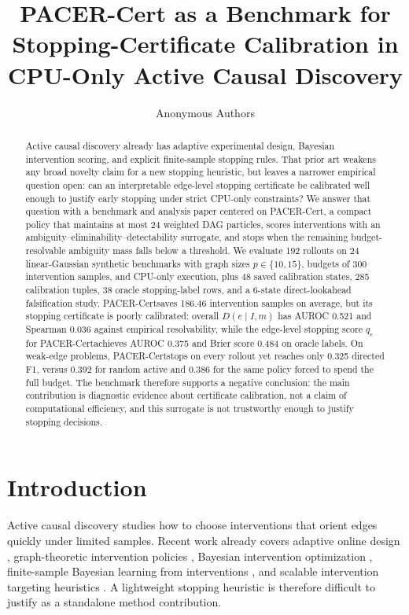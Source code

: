 \documentclass{article}
\title{PACER-Cert as a Benchmark for\\Stopping-Certificate Calibration in CPU-Only Active Causal Discovery}
\author{Anonymous Authors}
\newcommand{\method}{PACER-Cert}
\newcommand{\qe}{q_e}
\newcommand{\de}{D}
\begin{document}
\maketitle

\begin{abstract}
Active causal discovery already has adaptive experimental design, Bayesian intervention scoring, and explicit finite-sample stopping rules. That prior art weakens any broad novelty claim for a new stopping heuristic, but leaves a narrower empirical question open: can an interpretable edge-level stopping certificate be calibrated well enough to justify early stopping under strict CPU-only constraints? We answer that question with a benchmark and analysis paper centered on \method, a compact policy that maintains at most 24 weighted DAG particles, scores interventions with an ambiguity--eliminability--detectability surrogate, and stops when the remaining budget-resolvable ambiguity mass falls below a threshold. We evaluate 192 rollouts on 24 linear-Gaussian synthetic benchmarks with graph sizes $p\in\{10,15\}$, budgets of 300 intervention samples, and CPU-only execution, plus 48 saved calibration states, 285 calibration tuples, 38 oracle stopping-label rows, and a 6-state direct-lookahead falsification study. \method saves 186.46 intervention samples on average, but its stopping certificate is poorly calibrated: overall $\de(e\mid I,m)$ has AUROC 0.521 and Spearman 0.036 against empirical resolvability, while the edge-level stopping score $\qe$ for \method achieves AUROC 0.375 and Brier score 0.484 on oracle labels. On weak-edge problems, \method stops on every rollout yet reaches only 0.325 directed F1, versus 0.392 for random active and 0.386 for the same policy forced to spend the full budget. The benchmark therefore supports a negative conclusion: the main contribution is diagnostic evidence about certificate calibration, not a claim of computational efficiency, and this surrogate is not trustworthy enough to justify stopping decisions.
\end{abstract}

\section{Introduction}

Active causal discovery studies how to choose interventions that orient edges quickly under limited samples. Recent work already covers adaptive online design \citep{elahi2024aoed}, graph-theoretic intervention policies \citep{squires2020dct}, Bayesian intervention optimization \citep{wang2024bio, toth2022abci, zhang2023optimal}, finite-sample Bayesian learning from interventions \citep{zhou2024sampleefficient}, and scalable intervention targeting heuristics \citep{olko2023git, tigas2022where}. A lightweight stopping heuristic is therefore difficult to justify as a standalone method contribution.
\end{document}
